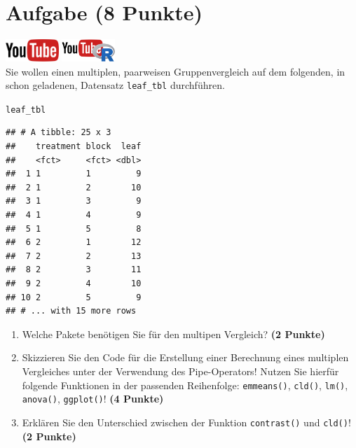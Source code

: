 \documentclass[a4paper, 10pt]{scrartcl}\usepackage[]{graphicx}\usepackage[]{xcolor}
\makeatletter
\newcommand{\hlstd}[1]{\textcolor[rgb]{0.345,0.345,0.345}{#1}}%
\newenvironment{kframe}{%
 \def\at@end@of@kframe{}%
 \ifinner\ifhmode%
  \def\at@end@of@kframe{\end{minipage}}%
  \begin{minipage}{\columnwidth}%
 \fi\fi%
 \def\FrameCommand##1{\hskip\@totalleftmargin \hskip-\fboxsep
 \colorbox{shadecolor}{##1}\hskip-\fboxsep
     \hskip-\linewidth \hskip-\@totalleftmargin \hskip\columnwidth}%
 \MakeFramed {\advance\hsize-\width
   \@totalleftmargin\z@ \linewidth\hsize
   \@setminipage}}%
 {\par\unskip\endMakeFramed%
 \at@end@of@kframe}
\newenvironment{knitrout}{}{} %
\makeatother
\begin{document}
 
\clearpage

\section{Aufgabe \hfill (8 Punkte)}

\hfill\href{https://youtu.be/f5fHm_jCHe4}{\includegraphics[width =
  2cm]{img/youtube}}
\hspace{2Ex}
\href{https://youtu.be/_EGebjrOCUQ}{\includegraphics[width =
  2cm]{img/youtube_R}}\\[1Ex]


Sie wollen einen multiplen, paarweisen Gruppenvergleich auf dem folgenden, in \Rlogo schon geladenen, Datensatz \texttt{leaf\_tbl} durchf{\"u}hren.



\begin{knitrout}
\color{fgcolor}\begin{kframe}
\begin{alltt}
\hlstd{leaf_tbl}
\end{alltt}
\begin{verbatim}
## # A tibble: 25 x 3
##    treatment block  leaf
##    <fct>     <fct> <dbl>
##  1 1         1         9
##  2 1         2        10
##  3 1         3         9
##  4 1         4         9
##  5 1         5         8
##  6 2         1        12
##  7 2         2        13
##  8 2         3        11
##  9 2         4        10
## 10 2         5         9
## # ... with 15 more rows
\end{verbatim}
\end{kframe}
\end{knitrout}

\begin{enumerate}
\item Welche \Rlogo Pakete ben{\"o}tigen Sie f{\"u}r den multipen Vergleich?
  \textbf{(2 Punkte)} 
\item Skizzieren Sie den \Rlogo Code f{\"u}r die Erstellung einer
  Berechnung eines multiplen Vergleiches unter der Verwendung des
  Pipe-Operators! Nutzen Sie hierf{\"u}r folgende Funktionen in der passenden
  Reihenfolge: \texttt{emmeans()},  \texttt{cld()},
  \texttt{lm()},  \texttt{anova()},  \texttt{ggplot()}!  \textbf{(4 Punkte)}
\item Erkl{\"a}ren Sie den Unterschied zwischen der Funktion
  \texttt{contrast()} und \texttt{cld()}!
  \textbf{(2 Punkte)}
\end{enumerate}
\end{document}
